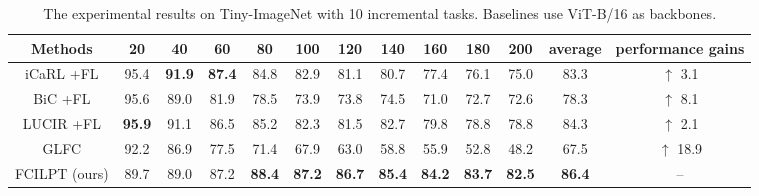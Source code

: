\documentclass[sigconf,anonymous,review,screen]{acmart}
\begin{document}
\begin{table*}[t]\footnotesize
	\centering
	\caption{The experimental results on Tiny-ImageNet with 10 incremental tasks. Baselines use ViT-B/16 as backbones.}
	\label{tab:11}{
		\begin{tabular}{ccccccccccccc}
			\toprule
			Methods & 20 & 40 & 60 & 80 & 100 & 120 & 140 & 160 & 180 & 200 & average &performance gains\\
			\midrule
			iCaRL \cite{rebuffi2017icarl}+FL  & 95.4 & \textbf{91.9} & \textbf{87.4} & 84.8 & 82.9 & 81.1 & 80.7 & 77.4 & 76.1 & 75.0 & 83.3 & $\uparrow$ 3.1  \\
			BiC \cite{wu2019large}+FL & 95.6 & 89.0 & 81.9 & 78.5 & 73.9 & 73.8 & 74.5 & 71.0 & 72.7 & 72.6 & 78.3 & $\uparrow$ 8.1 \\
			LUCIR \cite{hou2019learning}+FL& \textbf{95.9} & 91.1 & 86.5 & 85.2 & 82.3 & 81.5 & 82.7 & 79.8 & 78.8 & 78.8 & 84.3 & $\uparrow$ 2.1 \\
			GLFC \cite{dong2022federated} & 92.2 & 86.9 & 77.5 & 71.4 & 67.9 & 63.0 & 58.8 & 55.9 & 52.8 & 48.2 & 67.5 & $\uparrow$ 18.9 \\
			FCILPT (ours) & 89.7 & 89.0 & 87.2 & \textbf{88.4} & \textbf{87.2} & \textbf{86.7} & \textbf{85.4} & \textbf{84.2} & \textbf{83.7} & \textbf{82.5} & \textbf{86.4} & -- \\
			\bottomrule
	\end{tabular}	}
\end{table*}
\end{document}
